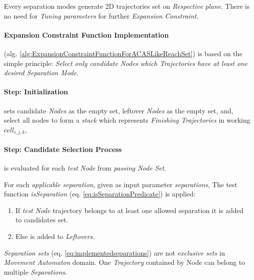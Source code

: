 \begin{note}
    Every separation modes generate 2D trajectories set on \emph{Respective plane}. There is no need for \emph{Tuning parameters} for further \emph{Expansion Constraint}.    
\end{note}

\paragraph{Expansion Constraint Function Implementation} (alg. \ref{alg:ExpansionConstraintFunctionForACASLikeReachSet}) is based on the simple principle:
\emph{Select only candidate Nodes which Trajectories have at least one desired Separation Mode}.

\paragraph{Step: Initialization} sets candidate \emph{Nodes} as the empty set,  leftover \emph{Nodes} as the empty set, and, select all nodes to form a \emph{stack} which represents \emph{Finishing Trajectories} in working $cell_{i,j,k}$,

\paragraph{Step: Candidate Selection Process} is evaluated for each \emph{test Node} from \emph{passing Node Set}. 

For each \emph{applicable separation}, given as input parameter \emph{separations}, The test function \emph{isSeparation} (eq. \ref{eq:isSeparationPredicate}) is applied:
\begin{enumerate}
    \item If \emph{test Node} trajectory belongs to at least one allowed separation it is added to candidates set.
    \item Else is added to \emph{Leftovers}.
\end{enumerate}

\begin{note}
    \emph{Separation sets} (eq. \ref{eq:implementedseparations}) are not \emph{exclusive sets} in \emph{Movement Automaton} domain. One \emph{Trajectory} contained by Node can belong to multiple \emph{Separations}.    
\end{note}

